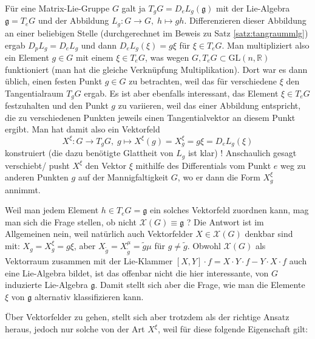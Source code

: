 \documentclass[../H_Analysis_main.tex]{subfiles}
\begin{document}
Für eine Matrix-Lie-Gruppe $G$ galt ja $T_g G = D_e L_g (\mathfrak{g})$ mit der Lie-Algebra $\mathfrak{g} = T_e G$ und der Abbildung $L_g: G \rightarrow G, \; h \mapsto g h$. Differenzieren dieser Abbildung an einer beliebigen Stelle (durchgerechnet im Beweis zu Satz \ref{satz:tangraummlg}) ergab $D_p L_g = D_e L_g$ und dann $D_e L_g(\xi) = g \xi$ für $\xi \in T_e G$. Man multipliziert also ein Element $g \in G$ mit einem $\xi \in T_e G$, was wegen $G, T_e G \subset \text{GL}(n, \mathbb{R})$ funktioniert (man hat die gleiche Verknüpfung Multiplikation). Dort war es dann üblich, einen festen Punkt $g \in G$ zu betrachten, weil das für verschiedene $\xi$ den Tangentialraum $T_g G$ ergab. Es ist aber ebenfalls interessant, das Element $\xi \in T_e G$ festzuhalten und den Punkt $g$ zu variieren, weil das einer Abbildung entspricht, die zu verschiedenen Punkten jeweils einen Tangentialvektor an diesem Punkt ergibt. Man hat damit also ein Vektorfeld
\begin{equation}
X^\xi: G \rightarrow T_g G, \; g \mapsto X^\xi(g) = X^\xi_g = g \xi = D_e L_g(\xi)
\end{equation}
konstruiert (die dazu benötigte Glattheit von $L_g$ ist klar) ! Anschaulich gesagt verschiebt/ pusht $X^\xi$ den Vektor $\xi$ mithilfe des Differentials vom Punkt $e$ weg zu anderen Punkten $g$ auf der Mannigfaltigkeit $G$, wo er dann die Form $X^\xi_g$ annimmt.


Weil man jedem Element $h \in T_e G = \mathfrak{g}$ ein solches Vektorfeld zuordnen kann, mag man sich die Frage stellen, ob nicht $\mathcal{X}(G) \equiv \mathfrak{g}$ ? Die Antwort ist im Allgemeinen nein, weil natürlich auch Vektorfelder $X \in \mathcal{X}(G)$ denkbar sind mit: $X_g = X^\xi_g = g\xi$, aber $X_{\tilde{g}} = X^\mu_{\tilde{g}} = \tilde{g} \mu$ für $g \neq \tilde{g}$. Obwohl $\mathcal{X}(G)$ als Vektorraum zusammen mit der Lie-Klammer $[X, Y] \cdot f = X \cdot Y \cdot f - Y \cdot X \cdot f$ auch eine Lie-Algebra bildet, ist das offenbar nicht die hier interessante, von $G$ induzierte Lie-Algebra $\mathfrak{g}$. Damit stellt sich aber die Frage, wie man die Elemente $\xi$ von $\mathfrak{g}$ alternativ klassifizieren kann.


Über Vektorfelder zu gehen, stellt sich aber trotzdem als der richtige Ansatz heraus, jedoch nur solche von der Art $X^\xi$, weil für diese folgende Eigenschaft gilt:
\end{document}
